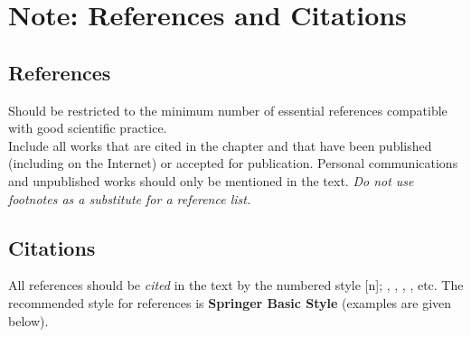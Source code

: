 \documentclass[graybox, nosecnum]{svmult}
\begin{document}
\section{\color{red}Note: References and Citations}
\subsection{\color{red}References}
Should be restricted to the minimum number of essential references compatible with good scientific practice.\\
Include all works that are cited in the chapter and that have been published (including on the Internet) or accepted for publication. Personal communications and unpublished works should only be mentioned in the text. \textit{Do not use footnotes as a substitute for a reference list.}\
\subsection{\color{red}Citations}
All references should be \textit{cited} in the text by the numbered style [n]; \cite{basic-contrib}, \cite{basic-online}, \cite{basic-DOI}, \cite{basic-journal} \cite{basic-mono}, etc. The recommended style for references is \textbf{Springer Basic Style} (examples are given below).

\end{document}
